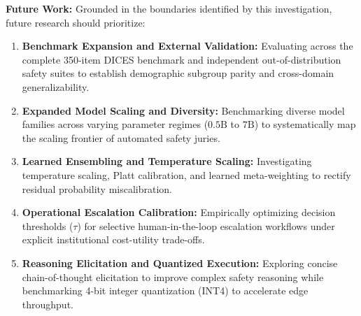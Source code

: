 \textbf{Future Work:} Grounded in the boundaries identified by this investigation, future research should prioritize:
\begin{enumerate}
    \item \textbf{Benchmark Expansion and External Validation:} Evaluating across the complete 350-item DICES benchmark and independent out-of-distribution safety suites to establish demographic subgroup parity and cross-domain generalizability.
    \item \textbf{Expanded Model Scaling and Diversity:} Benchmarking diverse model families across varying parameter regimes ($0.5\text{B}$ to $7\text{B}$) to systematically map the scaling frontier of automated safety juries.
    \item \textbf{Learned Ensembling and Temperature Scaling:} Investigating temperature scaling, Platt calibration, and learned meta-weighting to rectify residual probability miscalibration.
    \item \textbf{Operational Escalation Calibration:} Empirically optimizing decision thresholds ($\tau$) for selective human-in-the-loop escalation workflows under explicit institutional cost-utility trade-offs.
    \item \textbf{Reasoning Elicitation and Quantized Execution:} Exploring concise chain-of-thought elicitation to improve complex safety reasoning while benchmarking 4-bit integer quantization (INT4) to accelerate edge throughput.
\end{enumerate}
